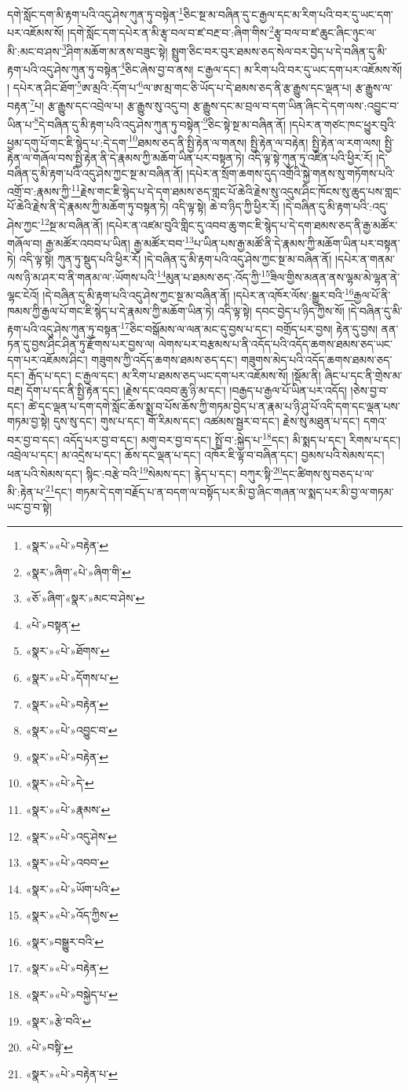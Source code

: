 དགེ་སློང་དག་མི་རྟག་པའི་འདུ་ཤེས་ཀུན་ཏུ་བསྟེན་\footnote{«སྣར་»«པེ་»བརྟེན་}ཅིང་སྔ་མ་བཞིན་དུ་ང་རྒྱལ་དང་མ་རིག་པའི་བར་དུ་ཡང་དག་པར་འཇོམས་སོ། །དགེ་སློང་དག་དཔེར་ན་མི་རྩྭ་བལ་བ་ཛ་བརྔ་བ་:ཞིག་གིས་\footnote{«སྣར་»ཞིག་«པེ་»ཞིག་གི་}རྩྭ་བལ་བ་ཛ་ཆུང་ཞིང་ཉུང་ལ་མི་:མང་བ་ཤས་\footnote{«ཅོ་»ཞིག་«སྣར་»མང་བ་ཤེས་}ཤིག་མཆོག་མ་ནས་བཟུང་སྟེ། སྤྲུག་ཅིང་བར་བུར་ཐམས་ཅད་སེལ་བར་བྱེད་པ་དེ་བཞིན་དུ་མི་རྟག་པའི་འདུ་ཤེས་ཀུན་ཏུ་བསྟེན་\footnote{«པེ་»བསྟན་}ཅིང་ཞེས་བྱ་བ་ནས། ང་རྒྱལ་དང་། མ་རིག་པའི་བར་དུ་ཡང་དག་པར་འཇོམས་སོ། །
དཔེར་ན་ཤིང་ཐོག་\footnote{«སྣར་»«པེ་»ཐོགས་}ཨ་མྲའི་:དོག་པ་\footnote{«སྣར་»«པེ་»དོགས་པ་}ལ་ཨ་མྲ་གང་ཅི་ཡོད་པ་དེ་ཐམས་ཅད་ནི་རྩ་རྒྱུས་དང་ལྡན་པ། རྩ་རྒྱུས་ལ་བརྟན་\footnote{«སྣར་»«པེ་»བརྟེན་}པ། རྩ་རྒྱུས་དང་འབྲེལ་པ། རྩ་རྒྱུས་སུ་འདུ་བ། རྩ་རྒྱུས་དང་མ་བྲལ་བ་དག་ཡིན་ཞིང་དེ་དག་ལས་:འབྱུང་བ་ཡིན་པ་\footnote{«སྣར་»«པེ་»འབྱུང་བ་}དེ་བཞིན་དུ་མི་རྟག་པའི་འདུ་ཤེས་ཀུན་ཏུ་བསྟེན་\footnote{«སྣར་»«པེ་»བརྟེན་}ཅིང་སྟེ་སྔ་མ་བཞིན་ནོ། །དཔེར་ན་གཙང་ཁང་ཕྱུར་བུའི་ཕྱམ་དགུ་པོ་གང་ཇི་སྙེད་པ་:དེ་དག་\footnote{«སྣར་»«པེ་»དེ་}ཐམས་ཅད་ནི་སྤྱི་རྟེན་ལ་གནས། སྤྱི་རྟེན་ལ་བརྟེན། སྤྱི་རྟེན་ལ་རག་ལས། སྤྱི་རྟེན་ལ་གཞོལ་བས་སྤྱི་རྟེན་ནི་དེ་རྣམས་ཀྱི་མཆོག་ཡིན་པར་བསྟན་ཏེ། འདི་ལྟ་སྟེ་ཀུན་ཏུ་འཛིན་པའི་ཕྱིར་རོ། །དེ་བཞིན་དུ་མི་རྟག་པའི་འདུ་ཤེས་ཀྱང་སྔ་མ་བཞིན་ནོ། །དཔེར་ན་སྲོག་ཆགས་དུད་འགྲོའི་སྐྱེ་གནས་སུ་གཏོགས་པའི་འགྲོ་བ་:རྣམས་ཀྱི་\footnote{«སྣར་»«པེ་»རྣམས་}རྗེས་གང་ཇི་སྙེད་པ་དེ་དག་ཐམས་ཅད་གླང་པོ་ཆེའི་རྗེས་སུ་འདུས་ཤིང་ཁོངས་སུ་ཆུད་པས་གླང་པོ་ཆེའི་རྗེས་ནི་དེ་རྣམས་ཀྱི་མཆོག་ཏུ་བསྟན་ཏེ། འདི་ལྟ་སྟེ། ཆེ་བ་ཉིད་ཀྱི་ཕྱིར་རོ། །དེ་བཞིན་དུ་མི་རྟག་པའི་:འདུ་ཤེས་ཀྱང་\footnote{«སྣར་»«པེ་»འདུ་ཤེས་}སྔ་མ་བཞིན་ནོ། །དཔེར་ན་འཛམ་བུའི་གླིང་དུ་འབབ་ཆུ་གང་ཇི་སྙེད་པ་དེ་དག་ཐམས་ཅད་ནི་རྒྱ་མཚོར་གཞོལ་བ། རྒྱ་མཚོར་འབབ་པ་ཡིན། རྒྱ་མཚོར་བབ་\footnote{«སྣར་»«པེ་»འབབ་}པ་ཡིན་པས་རྒྱ་མཚོ་ནི་དེ་རྣམས་ཀྱི་མཆོག་ཡིན་པར་བསྟན་ཏེ། འདི་ལྟ་སྟེ། ཀུན་ཏུ་སྡུད་པའི་ཕྱིར་རོ། །དེ་བཞིན་དུ་མི་རྟག་པའི་འདུ་ཤེས་ཀྱང་སྔ་མ་བཞིན་ནོ། །དཔེར་ན་གནམ་ལས་ཉི་མ་ཤར་བ་ནི་གནམ་ལ་:ཡོགས་པའི་\footnote{«སྣར་»«པེ་»ཡོག་པའི་}མུན་པ་ཐམས་ཅད་:འོད་ཀྱི་\footnote{«སྣར་»«པེ་»འོད་ཀྱིས་}ཟིལ་གྱིས་མནན་ནས་ལྷམ་མེ་ལྷན་ནེ་ལྷང་ངེའོ། །དེ་བཞིན་དུ་མི་རྟག་པའི་འདུ་ཤེས་ཀྱང་སྔ་མ་བཞིན་ནོ། །དཔེར་ན་འཁོར་ལོས་:སྒྱུར་བའི་\footnote{«སྣར་»བསྒྱུར་བའི་}རྒྱལ་པོ་ནི་ཁམས་ཀྱི་རྒྱལ་པོ་གང་ཇི་སྙེད་པ་དེ་རྣམས་ཀྱི་མཆོག་ཡིན་ཏེ། འདི་ལྟ་སྟེ། དབང་བྱེད་པ་ཉིད་ཀྱིས་སོ། །དེ་བཞིན་དུ་མི་རྟག་པའི་འདུ་ཤེས་ཀུན་ཏུ་བསྟན་\footnote{«སྣར་»«པེ་»བརྟེན་}ཅིང་བསྒོམས་ལ་ལན་མང་དུ་བྱས་པ་དང་། བགྲོད་པར་བྱས། རྟེན་དུ་བྱས། ནན་ཏན་དུ་བྱས་ཤིང་ཤིན་ཏུ་རྫོགས་པར་བྱས་ལ། ལེགས་པར་བརྩམས་པ་ནི་འདོད་པའི་འདོད་ཆགས་ཐམས་ཅད་ཡང་དག་པར་འཇོམས་ཤིང་། གཟུགས་ཀྱི་འདོད་ཆགས་ཐམས་ཅད་དང་། གཟུགས་མེད་པའི་འདོད་ཆགས་ཐམས་ཅད་དང་། རྒོད་པ་དང་། ང་རྒྱལ་དང་། མ་རིག་པ་ཐམས་ཅད་ཡང་དག་པར་འཇོམས་སོ། །སྡོམ་ནི། ཞིང་པ་དང་ནི་གྲེས་མ་བརྔ། དོག་པ་དང་ནི་སྤྱི་རྟེན་དང་། །རྗེས་དང་འབབ་ཆུ་ཉི་མ་དང་། །བརྒྱད་པ་རྒྱལ་པོ་ཡིན་པར་འདོད། །ཅེས་བྱ་བ་དང་། ཚེ་དང་ལྡན་པ་དག་དགེ་སློང་ཆོས་སྨྲ་བ་པོས་ཆོས་ཀྱི་གཏམ་བྱེད་པ་ན་རྣམ་པ་ཉི་ཤུ་པོ་འདི་དག་དང་ལྡན་པས་གཏམ་བྱ་སྟེ། དུས་སུ་དང་། གུས་པ་དང་། གོ་རིམས་དང་། འཚམས་སྦྱར་བ་དང་། རྗེས་སུ་མཐུན་པ་དང་། དགའ་བར་བྱ་བ་དང་། འདོད་པར་བྱ་བ་དང་། མགུ་བར་བྱ་བ་དང་། སྤྲོ་བ་:སྐྱེད་པ་\footnote{«སྣར་»«པེ་»བསྐྱེད་པ་}དང་། མི་སྨད་པ་དང་། རིགས་པ་དང་། འབྲེལ་པ་དང་། མ་འདྲེས་པ་དང་། ཆོས་དང་ལྡན་པ་དང་། འཁོར་ཇི་ལྟ་བ་བཞིན་དང་། བྱམས་པའི་སེམས་དང་། ཕན་པའི་སེམས་དང་། སྙིང་:བརྩེ་བའི་\footnote{«སྣར་»རྩེ་བའི་}སེམས་དང་། རྙེད་པ་དང་། བཀུར་སྟི་\footnote{«པེ་»བསྟི་}དང་ཚིགས་སུ་བཅད་པ་ལ་མི་:རྟེན་པ་\footnote{«སྣར་»«པེ་»བརྟེན་པ་}དང་། གཏམ་དེ་དག་བརྗོད་པ་ན་བདག་ལ་བསྟོད་པར་མི་བྱ་ཞིང་གཞན་ལ་སྨད་པར་མི་བྱ་ལ་གཏམ་ཡང་བྱ་བ་སྟེ། 